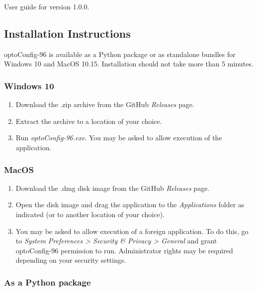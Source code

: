 User guide for version 1.0.0.

\hypertarget{installation-instructions}{%
\subsection{Installation Instructions}\label{installation-instructions}}

optoConfig-96 is available as a Python package or as standalone bundles
for Windows 10 and MacOS 10.15. Installation should not take more than 5
minutes.

\hypertarget{windows-10}{%
\subsubsection{Windows 10}\label{windows-10}}

\begin{enumerate}
\def\labelenumi{\arabic{enumi}.}
\tightlist
\item
  Download the .zip archive from the GitHub \emph{Releases} page.
\item
  Extract the archive to a location of your choice.
\item
  Run \emph{optoConfig-96.exe}. You may be asked to allow execution of
  the application.
\end{enumerate}

\hypertarget{macos}{%
\subsubsection{MacOS}\label{macos}}

\begin{enumerate}
\def\labelenumi{\arabic{enumi}.}
\tightlist
\item
  Download the .dmg disk image from the GitHub \emph{Releases} page.
\item
  Open the disk image and drag the application to the
  \emph{Applications} folder as indicated (or to another location of
  your choice).
\item
  You may be asked to allow execution of a foreign application. To do
  this, go to \emph{System Preferences \textgreater{} Security \&
  Privacy \textgreater{} General} and grant optoConfig-96 permission to
  run. Administrator rights may be required depending on your security
  settings.
\end{enumerate}

\hypertarget{as-a-python-package}{%
\subsubsection{As a Python package}\label{as-a-python-package}}

